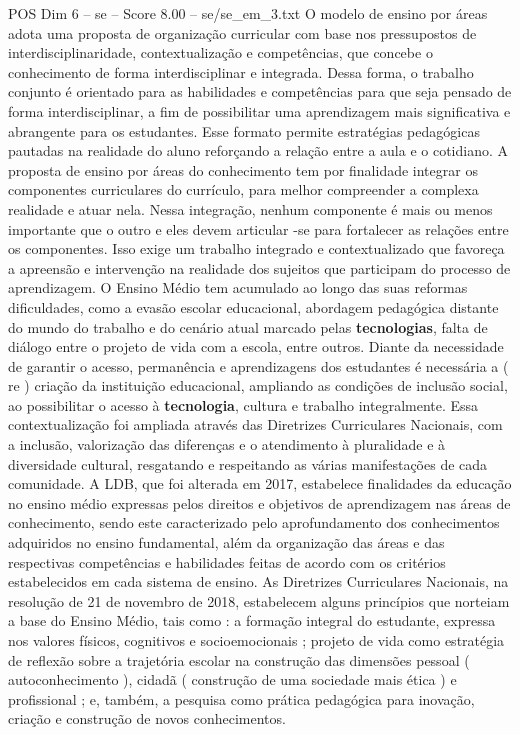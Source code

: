\begin{textsample}{POS Dim 6 – se – Score 8.00 – se/se\_em\_3.txt}
O modelo de ensino por áreas adota uma proposta de organização curricular com base nos pressupostos de interdisciplinaridade, contextualização e competências, que concebe o conhecimento de forma interdisciplinar e integrada.
Dessa forma, o trabalho conjunto é orientado para as habilidades e competências para que seja pensado de forma interdisciplinar, a fim de possibilitar uma aprendizagem mais significativa e abrangente para os estudantes.
Esse formato permite estratégias pedagógicas pautadas na realidade do aluno reforçando a relação entre a aula e o cotidiano.
A proposta de ensino por áreas do conhecimento tem por finalidade integrar os componentes curriculares do currículo, para melhor compreender a complexa realidade e atuar nela.
Nessa integração, nenhum componente é mais ou menos importante que o outro e eles devem articular -se para fortalecer as relações entre os componentes.
Isso exige um trabalho integrado e contextualizado que favoreça a apreensão e intervenção na realidade dos sujeitos que participam do processo de aprendizagem.
O Ensino Médio tem acumulado ao longo das suas reformas dificuldades, como a evasão escolar educacional, abordagem pedagógica distante do mundo do trabalho e do cenário atual marcado pelas \textbf{tecnologias}, falta de diálogo entre o projeto de vida com a escola, entre outros.
Diante da necessidade de garantir o acesso, permanência e aprendizagens dos estudantes é necessária a ( re ) criação da instituição educacional, ampliando as condições de inclusão social, ao possibilitar o acesso à \textbf{tecnologia}, cultura e trabalho integralmente.
Essa contextualização foi ampliada através das Diretrizes Curriculares Nacionais, com a inclusão, valorização das diferenças e o atendimento à pluralidade e à diversidade cultural, resgatando e respeitando as várias manifestações de cada comunidade.
A LDB, que foi alterada em 2017, estabelece finalidades da educação no ensino médio expressas pelos direitos e objetivos de aprendizagem nas áreas de conhecimento, sendo este caracterizado pelo aprofundamento dos conhecimentos adquiridos no ensino fundamental, além da organização das áreas e das respectivas competências e habilidades feitas de acordo com os critérios estabelecidos em cada sistema de ensino.
As Diretrizes Curriculares Nacionais, na resolução de 21 de novembro de 2018, estabelecem alguns princípios que norteiam a base do Ensino Médio, tais como : a formação integral do estudante, expressa nos valores físicos, cognitivos e socioemocionais ; projeto de vida como estratégia de reflexão sobre a trajetória escolar na construção das dimensões pessoal ( autoconhecimento ), cidadã ( construção de uma sociedade mais ética ) e profissional ; e, também, a pesquisa como prática pedagógica para inovação, criação e construção de novos conhecimentos.

\end{textsample}
